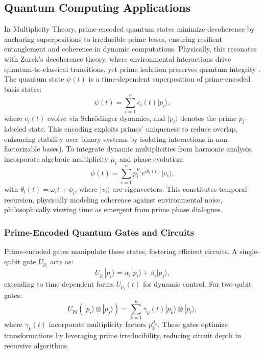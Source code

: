 \documentclass{article}
\theoremstyle{plain}
\begin{document}
\begin{enumerate}
\subsection{Quantum Computing Applications}
In Multiplicity Theory, prime-encoded quantum states minimize decoherence by anchoring superpositions to irreducible prime bases, ensuring resilient entanglement and coherence in dynamic computations. Physically, this resonates with Zurek's decoherence theory, where environmental interactions drive quantum-to-classical transitions, yet prime isolation preserves quantum integrity \cite{zurek1993}.
The quantum state $\psi(t)$ is a time-dependent superposition of prime-encoded basis states:
\begin{equation}
\psi(t) = \sum_{i=1}^{n} c_i(t) |p_i\rangle,
\end{equation}
where $c_i(t)$ evolve via Schrödinger dynamics, and $|p_i\rangle$ denotes the prime $p_i$-labeled state. This encoding exploits primes' uniqueness to reduce overlap, enhancing stability over binary systems by isolating interactions in non-factorizable bases).
To integrate dynamic multiplicities from harmonic analysis, incorporate algebraic multiplicity $\mu_i$ and phase evolution:
\begin{equation}
\psi(t) = \sum_{i=1}^{n} p_i^{\mu_i} e^{i \theta_i(t)} |v_i\rangle,
\end{equation}
with $\theta_i(t) = \omega_i t + \phi_i$, where $|v_i\rangle$ are eigenvectors. This constitutes temporal recursion, physically modeling coherence against environmental noise, philosophically viewing time as emergent from prime phase dialogues.

\subsubsection{Prime-Encoded Quantum Gates and Circuits}
Prime-encoded gates manipulate these states, fostering efficient circuits. A single-qubit gate $U_{p_i}$ acts as:
\begin{equation}
U_{p_i} |p_i\rangle = \alpha_i |p_i\rangle + \beta_i |p_j\rangle,
\end{equation}
extending to time-dependent forms $U_{p_i}(t)$ for dynamic control. For two-qubit gates:
\begin{equation}
U_{pq} (|p_i\rangle \otimes |p_j\rangle) = \sum_{k=1}^{n} \gamma_k(t) |p_k\rangle \otimes |p_l\rangle,
\end{equation}
where $\gamma_k(t)$ incorporate multiplicity factors $p_k^{\mu_k}$. These gates optimize transformations by leveraging prime irreducibility, reducing circuit depth in recursive algorithms.


\end{enumerate}
\end{document}
